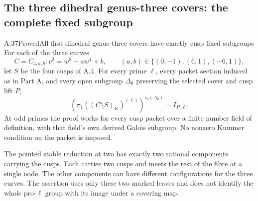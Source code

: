 \subsection{The three dihedral genus-three covers: the complete fixed subgroup}

\begin{statement}{A.37}{Proved}{All first dihedral genus-three covers have exactly cusp fixed subgroups}
For each of the three curves
\[
 C=C_{4,a,b}:v^2=w^8+aw^4+b,
 \qquad (a,b)\in\{(0,-1),(6,1),(-6,1)\},
\]
let \(S\) be the four cusps of A.4. For every prime \(\ell\),
every packet section induced as in Part A, and every open subgroup
\(\Delta_0\) preserving the selected cover and cusp lift \(P\),
\[
 \left(\pi_1((C\setminus S)_{\bar K})^{(\ell)}\right)^{s_b(\Delta_0)}
       =I_{P,\ell}.                                      \tag{A.37.1}
\]
At odd primes the proof works for every cusp packet over a finite
number field of definition, with that field's own derived Galois
subgroup. No nonzero Kummer condition on the packet is imposed.

The pointed stable reduction at two has exactly two rational
components carrying the cusps. Each carries two cusps and meets
the rest of the fibre at a single node. The other components can
have different configurations for the three curves. The assertion
uses only these two marked leaves and does not identify the whole
pro-\(\ell\) group with its image under a covering map.
\end{statement}


